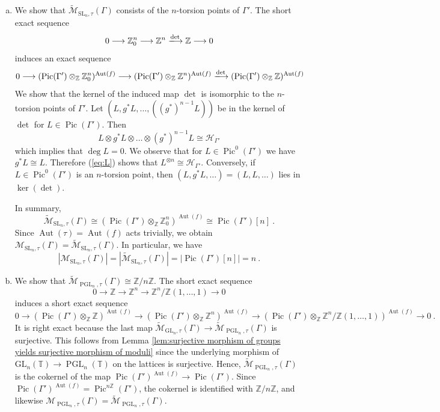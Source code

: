 \documentclass[10pt,a4paper]{amsart}
\DeclareMathOperator{\Aut}{Aut}
\newcommand{\GL}{{\mathrm{GL}}}
\newcommand{\Ga}{\Gamma}
\DeclareMathOperator{\PGL}{PGL}
\DeclareMathOperator{\Pic}{Pic}
\newcommand{\SL}{{\mathrm{SL}}}
\newcommand{\T}{\mathbb{T}}
\newcommand{\Z}{\mathbb{Z}}
\newcommand{\calH}{\mathcal{H}}
\newcommand{\calM}{\mathcal{M}}
\newcommand{\wmc}[1]{{\widetilde{\mathcal{#1}}}}
\begin{document}
\begin{example}
\begin{enumerate}[(a)]
    
    \item  We show that $\wmc M_{\SL_n,\tau}(\Ga)$ consists of the $n$-torsion points of $\Gamma'$. 
    The short exact sequence
    \[
    0 \longrightarrow \Z^n_0 \longrightarrow \Z^n \xlongrightarrow{\det} \Z \longrightarrow 0
    \]
    induces an exact sequence
    \[
    0 \longrightarrow (\Pic(\Gamma') \otimes_\Z \Z^n_0)^{\Aut(f)} \longrightarrow (\Pic(\Gamma') \otimes_\Z \Z^n)^{\Aut(f)} \xlongrightarrow{\det} (\Pic(\Gamma') \otimes_\Z \Z)^{\Aut(f)}
    \]
    We show that the kernel of the induced map $\det$ is isomorphic to the $n$-torsion points of $\Gamma'$.
    Let $(L,g^{*}L,\dots,((g^{*})^{n-1}L))$ be in the kernel of $\det$ for $L \in \Pic(\Gamma')$. Then 
    \begin{equation}
    \label{eq:L}
        L \otimes g^{*}L \otimes \dots \otimes (g^{*})^{n-1}L \cong \calH_{\Gamma'}
    \end{equation}
    which implies that $\deg L = 0$. 
    We observe that for $L \in \Pic^0(\Gamma')$ we have $g^{*}L \cong L$.
    Therefore (\ref{eq:L}) shows that $L^{\otimes n} \cong \calH_{\Gamma'}$. Conversely, if $L \in \Pic^0(\Gamma')$ is an $n$-torsion point, then $(L,g^{*}L,\dots) = (L,L,\dots)$ lies in $\ker(\det)$.

    In summary,
    \[
    \wmc M_{\SL_n,\tau}(\Ga) \cong (\Pic(\Gamma') \otimes_\Z \Z^n_0)^{\Aut(f)} \cong \Pic(\Gamma')[n] \ .
    \]
    Since $\Aut(\tau) = \Aut(f)$ acts trivially, we obtain $\calM_{\SL_n,\tau}(\Ga) = \wmc M_{\SL_n,\tau}(\Ga)$. In particular, we have 
    \[
    |\calM_{\SL_n,\tau}(\Ga)| = |\wmc M_{\SL_n,\tau}(\Ga)|=|\Pic(\Gamma')[n]|=n \ .
    \]
    \item 
    We show that $\wmc M_{\PGL_n,\tau}(\Gamma) \cong \Z / n\Z$. The short exact sequence
    \[
    0 \to \Z \to \Z^n \to \Z^n/\Z(1,\dots,1) \to 0
    \]
    induces a short exact sequence
    \[
    0 \to (\Pic(\Gamma') \otimes_\Z \Z)^{\Aut(f)} \to (\Pic(\Gamma') \otimes_\Z \Z^n)^{\Aut(f)} \to (\Pic(\Gamma') \otimes_\Z \Z^n / \Z(1,\ldots,1))^{\Aut(f)} \to 0 \ .
    \]
    It is right exact because the last map $\wmc M_{\GL_n,\tau}(\Ga) \to \wmc M_{\PGL_n,\tau}(\Ga)$ is surjective. This follows from Lemma \ref{lem:surjective morphism of groups yields surjective morphism of moduli} since the underlying morphism of $\GL_n(\T) \to \PGL_n(\T)$ on the lattices is surjective.
    Hence, $\wmc M_{\PGL_n,\tau}(\Ga)$ is the cokernel of the map $\Pic(\Gamma')^{\Aut(f)} \to \Pic(\Gamma')$. Since $\Pic(\Gamma')^{\Aut(f)} = \Pic^{n\Z}(\Gamma')$, the cokernel is identified with $\Z / n\Z$, and likewise $\calM_{\PGL_n,\tau}(\Ga) = \wmc M_{\PGL_n,\tau}(\Ga)$.
\end{enumerate}
\end{example}
\end{document}
